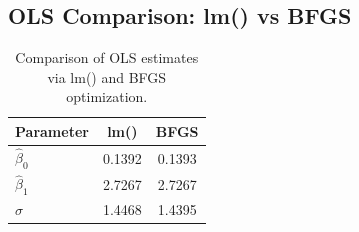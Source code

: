 \subsection*{OLS Comparison: lm() vs BFGS}
\begin{table}[h]
\centering
\begin{tabular}{lcc}
\hline
Parameter & lm() & BFGS \\
\hline
$\hat{\beta}_0$ & 0.1392 & 0.1393 \\
$\hat{\beta}_1$ & 2.7267 & 2.7267 \\
$\hat{\sigma}$ & 1.4468 & 1.4395 \\
\hline
\end{tabular}
\caption{Comparison of OLS estimates via lm() and BFGS optimization.}
\label{tab:ols_comparison}
\end{table}
